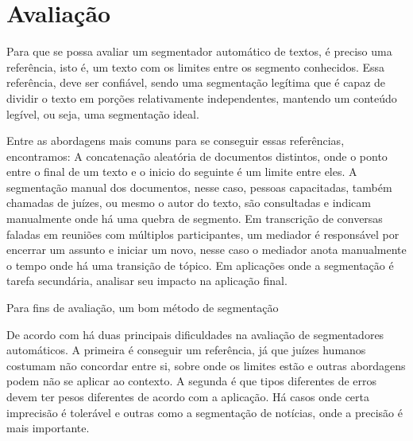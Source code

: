 
\section{Avaliação}
	\label{sec:avaliacao}


%

Para que se possa avaliar um segmentador automático de textos, é preciso uma referência, isto é, um texto com os limites entre os segmento conhecidos. Essa referência, deve ser confiável, sendo uma segmentação legítima que é capaz de dividir o texto em porções relativamente independentes, mantendo um conteúdo legível, ou seja, uma segmentação ideal.
%

Entre as abordagens mais comuns para se conseguir essas referências, encontramos: A concatenação aleatória de documentos distintos, onde o ponto entre o final de um texto e o inicio do seguinte é um limite entre eles. A segmentação manual dos documentos, nesse caso, pessoas capacitadas, também chamadas de juízes, ou mesmo o autor do texto, são consultadas e indicam manualmente onde há uma quebra de segmento. Em transcrição de conversas faladas em reuniões com múltiplos participantes, um mediador é responsável por encerrar um assunto e iniciar um novo, nesse caso o mediador anota manualmente o tempo onde há uma transição de tópico. Em aplicações onde a segmentação é tarefa secundária, analisar seu impacto na aplicação final.



Para fins de avaliação, um bom método de segmentação


	
	

De acordo com \cite{fulano} há duas principais dificuldades na avaliação de segmentadores automáticos. A primeira é conseguir um referência, já que juízes humanos costumam não concordar entre si, sobre onde os limites estão e outras abordagens podem não se aplicar ao contexto. A segunda é que tipos diferentes de erros devem ter pesos diferentes de acordo com a aplicação. Há casos onde certa imprecisão é tolerável e outras como a segmentação de notícias, onde a precisão é mais importante.



